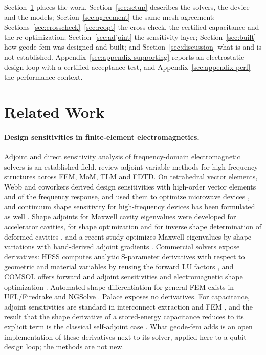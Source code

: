 \documentclass{anvil-paper}
\begin{document}
Section~\ref{sec:related} places the work. Section~\ref{sec:setup}
describes the solvers, the device and the models;
Section~\ref{sec:agreement} the same-mesh agreement;
Sections~\ref{sec:crosscheck}--\ref{sec:reopt} the cross-check, the
certified capacitance and the re-optimization;
Section~\ref{sec:adjoint} the sensitivity layer;
Section~\ref{sec:built} how geode-fem was designed and built; and
Section~\ref{sec:discussion} what is and is not established.
Appendix~\ref{sec:appendix-supporting} reports an electrostatic design
loop with a certified acceptance test, and
Appendix~\ref{sec:appendix-perf} the performance context.

\section{Related Work}
\label{sec:related}

\paragraph{Design sensitivities in finite-element electromagnetics.}
Adjoint and direct sensitivity analysis of frequency-domain
electromagnetic solvers is an established field. \citet{nikolova2004adjoint}
review adjoint-variable methods for high-frequency structures across FEM,
MoM, TLM and FDTD. On tetrahedral vector elements, Webb and coworkers
derived design sensitivities with high-order vector elements and of the
frequency response, and used them to optimize microwave devices
\citep{webb2001design,webb2002design,nair2003optimization}, and continuum
shape sensitivity for high-frequency devices has been formulated as well
\citep{choi2011generalized}. Shape adjoints for Maxwell cavity eigenvalues
were developed for accelerator cavities, for shape optimization
\citep{akcelik2005adjoint} and for inverse shape determination of
deformed cavities \citep{akcelik2008shape}, and a recent study
optimizes Maxwell eigenvalues by shape variations with hand-derived
adjoint gradients \citep{herter2026numerical}. Commercial solvers expose
derivatives: HFSS computes analytic S-parameter derivatives with respect
to geometric and material variables by reusing the forward LU factors
\citep{ansys_hfss_derivatives,vardapetyan2008sensitivity}, and COMSOL
offers forward and adjoint sensitivities and electromagnetic shape
optimization \citep{comsol_sensitivity_method,jensen2022comsolshape}.
Automated shape differentiation for general FEM exists in UFL/Firedrake
\citep{ham2019automated} and NGSolve \citep{gangl2021fully}. Palace exposes
no derivatives. For capacitance, adjoint sensitivities are standard in
interconnect extraction \citep{elmoselhy2008efficient} and FEM
\citep{ren2012computation}, and the result that the shape derivative of a
stored-energy capacitance reduces to its explicit term is the classical
self-adjoint case \citep{park2019continuum}. What geode-fem adds is an
open implementation of these derivatives next to its solver, applied here
to a qubit design loop; the methods are not new.
\end{document}
